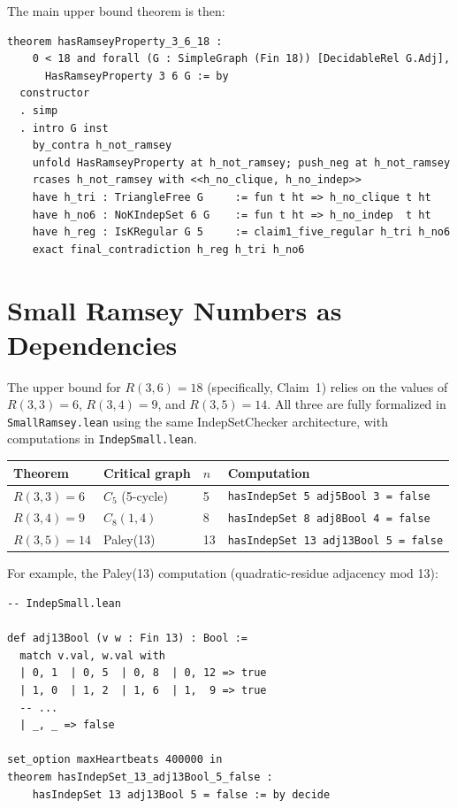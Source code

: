 \documentclass[11pt]{article}
\newcommand{\lean}[1]{\texttt{#1}}
\newcommand{\RR}[2]{R(#1,#2)}
\begin{document}
\noindent
The main upper bound theorem is then:

\begin{lstlisting}
theorem hasRamseyProperty_3_6_18 :
    0 < 18 and forall (G : SimpleGraph (Fin 18)) [DecidableRel G.Adj],
      HasRamseyProperty 3 6 G := by
  constructor
  . simp
  . intro G inst
    by_contra h_not_ramsey
    unfold HasRamseyProperty at h_not_ramsey; push_neg at h_not_ramsey
    rcases h_not_ramsey with <<h_no_clique, h_no_indep>>
    have h_tri : TriangleFree G     := fun t ht => h_no_clique t ht
    have h_no6 : NoKIndepSet 6 G    := fun t ht => h_no_indep  t ht
    have h_reg : IsKRegular G 5     := claim1_five_regular h_tri h_no6
    exact final_contradiction h_reg h_tri h_no6
\end{lstlisting}

\section{Small Ramsey Numbers as Dependencies}
\label{sec:small}

The upper bound for $R(3,6) = 18$ (specifically, Claim~1) relies on the
values of $\RR{3}{3} = 6$, $\RR{3}{4} = 9$, and $\RR{3}{5} = 14$.
All three are fully formalized in \texttt{SmallRamsey.lean} using the same
IndepSetChecker architecture, with computations in \texttt{IndepSmall.lean}.

\begin{center}
\begin{tabular}{llll}
\toprule
Theorem & Critical graph & $n$ & Computation \\
\midrule
$\RR{3}{3} = 6$ & $C_5$ (5-cycle)    &  5 & \lean{hasIndepSet 5 adj5Bool 3 = false} \\
$\RR{3}{4} = 9$ & $C_8(1,4)$         &  8 & \lean{hasIndepSet 8 adj8Bool 4 = false} \\
$\RR{3}{5} = 14$ & Paley(13)         & 13 & \lean{hasIndepSet 13 adj13Bool 5 = false} \\
\bottomrule
\end{tabular}
\end{center}

\noindent
For example, the Paley(13) computation (quadratic-residue adjacency mod 13):

\begin{lstlisting}
-- IndepSmall.lean

def adj13Bool (v w : Fin 13) : Bool :=
  match v.val, w.val with
  | 0, 1  | 0, 5  | 0, 8  | 0, 12 => true
  | 1, 0  | 1, 2  | 1, 6  | 1,  9 => true
  -- ...
  | _, _ => false

set_option maxHeartbeats 400000 in
theorem hasIndepSet_13_adj13Bool_5_false :
    hasIndepSet 13 adj13Bool 5 = false := by decide
\end{lstlisting}
\end{document}
